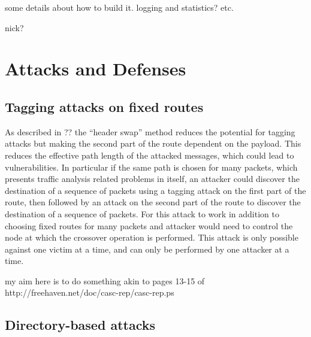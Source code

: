 \documentclass{llncs}
\begin{document}
some details about how to build it. logging and statistics? etc.

nick?


\section{Attacks and Defenses}
\label{sec:attacks}

\subsection{Tagging attacks on fixed routes}

As described in ?? the ``header swap'' method reduces the potential for tagging attacks but making the second part of the route dependent on the payload. This reduces the effective path length of the attacked messages, which could lead to vulnerabilities. In particular if the same path is chosen for many packets, which presents traffic analysis related problems in itself, an attacker could discover the destination of a sequence of packets using a tagging attack on the first part of the route, then followed by an attack on the second part of the route to discover the destination of a sequence of packets. For this attack to work in addition to choosing fixed routes for many packets and attacker would need to control the node at which the crossover operation is performed. This attack is only possible against one victim at a time, and can only be performed by one attacker at a time.

my aim here is to do something akin to pages 13-15 of
http://freehaven.net/doc/casc-rep/casc-rep.ps



\subsection{Directory-based attacks}
\label{subsec:attacks-dirbased}
\end{document}
